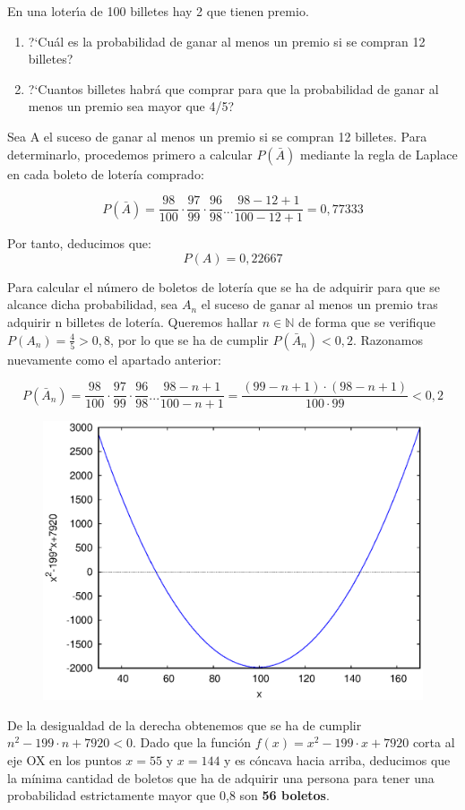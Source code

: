 \problem

En una loter{\'\i}a de 100 billetes hay 2 que tienen premio.
\begin{enumerate}
	\item ?`Cu{\'a}l es la probabilidad de ganar al menos un premio si  se  compran
	12 billetes?
	\item ?`Cuantos billetes habr{\'a} que comprar  para  que  la  probabilidad  de
	ganar al menos un  premio sea mayor que 4/5?
\end{enumerate}

\subproblem
Sea A el suceso de ganar al menos un premio si se compran 12 billetes. Para determinarlo, procedemos primero a calcular $P(\bar A)$ mediante la regla de Laplace en cada boleto de lotería comprado:
	
	$$
		P(\bar A) = \frac{98}{100}·\frac{97}{99}·\frac{96}{98}...\frac{98-12+1}{100-12+1} = 0,77333
	$$
	
	Por tanto, deducimos que: 
	$$
	 P(A) = 0,22667 
	$$
	
	\subproblem
	
	Para calcular el número de boletos de lotería que se ha de adquirir para que se alcance dicha probabilidad, sea $A_n$ el suceso de ganar al menos un premio tras adquirir n billetes de lotería. Queremos hallar $n \in \mathbb{N}$ de forma que se verifique $P(A_n) = \frac{4}{5} > 0,8$, por lo que 
	se ha de cumplir $P(\bar A_n) < 0,2$. Razonamos nuevamente como el apartado anterior:
	
	$$
	P(\bar A_n) = \frac{98}{100}·\frac{97}{99}·\frac{96}{98}...\frac{98-n+1}{100-n+1} = \frac{(99-n+1)·(98-n+1)}{100 \cdot 99} < 0,2
	$$

	\begin{figure}[h]
		\centering
		\includegraphics[scale=0.40]{ejercicio-6-grafica.eps}
	\end{figure}
	
		
	
	De la desigualdad de la derecha obtenemos que se ha de cumplir $n^2 -199·n + 7920 < 0$. Dado que la función $f(x) = x^2 -199·x + 7920$ corta al eje OX en los puntos $x=55$ y $x=144$ y es cóncava hacia arriba, deducimos que la mínima cantidad de boletos que ha de adquirir una persona para tener una probabilidad estrictamente mayor que 0,8 son \textbf{56 boletos}.